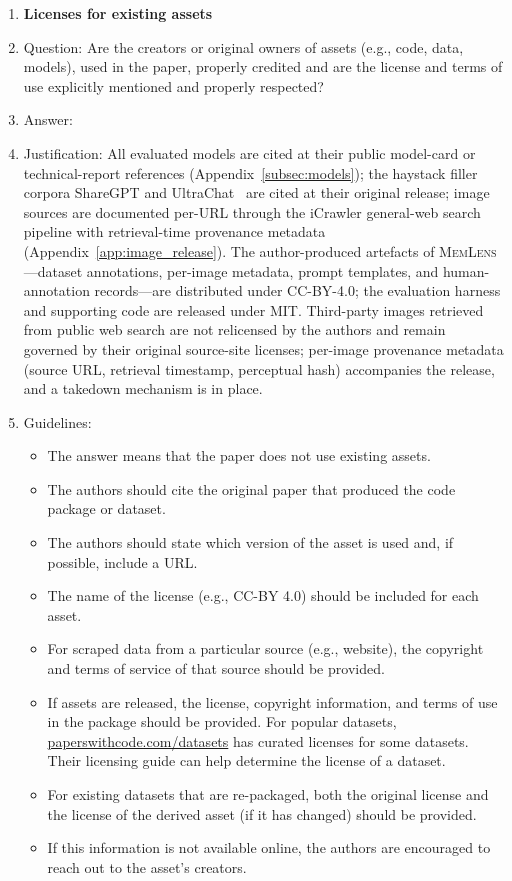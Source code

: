 \documentclass{article}
\newcommand{\bench}{\textsc{MemLens}}
\begin{document}
\begin{enumerate}
\item {\bf Licenses for existing assets}
    \item[] Question: Are the creators or original owners of assets (e.g., code, data, models), used in the paper, properly credited and are the license and terms of use explicitly mentioned and properly respected?
    \item[] Answer: \answerYes{}
    \item[] Justification: All evaluated models are cited at their public model-card or technical-report references (Appendix~\ref{subsec:models}); the haystack filler corpora ShareGPT and UltraChat~\cite{ding2023enhancing} are cited at their original release; image sources are documented per-URL through the iCrawler general-web search pipeline with retrieval-time provenance metadata (Appendix~\ref{app:image_release}). The author-produced artefacts of \bench{}---dataset annotations, per-image metadata, prompt templates, and human-annotation records---are distributed under CC-BY-4.0; the evaluation harness and supporting code are released under MIT. Third-party images retrieved from public web search are not relicensed by the authors and remain governed by their original source-site licenses; per-image provenance metadata (source URL, retrieval timestamp, perceptual hash) accompanies the release, and a takedown mechanism is in place.
    \item[] Guidelines:
    \begin{itemize}
        \item The answer \answerNA{} means that the paper does not use existing assets.
        \item The authors should cite the original paper that produced the code package or dataset.
        \item The authors should state which version of the asset is used and, if possible, include a URL.
        \item The name of the license (e.g., CC-BY 4.0) should be included for each asset.
        \item For scraped data from a particular source (e.g., website), the copyright and terms of service of that source should be provided.
        \item If assets are released, the license, copyright information, and terms of use in the package should be provided. For popular datasets, \url{paperswithcode.com/datasets} has curated licenses for some datasets. Their licensing guide can help determine the license of a dataset.
        \item For existing datasets that are re-packaged, both the original license and the license of the derived asset (if it has changed) should be provided.
        \item If this information is not available online, the authors are encouraged to reach out to the asset's creators.
    \end{itemize}


\end{enumerate}
\end{document}
